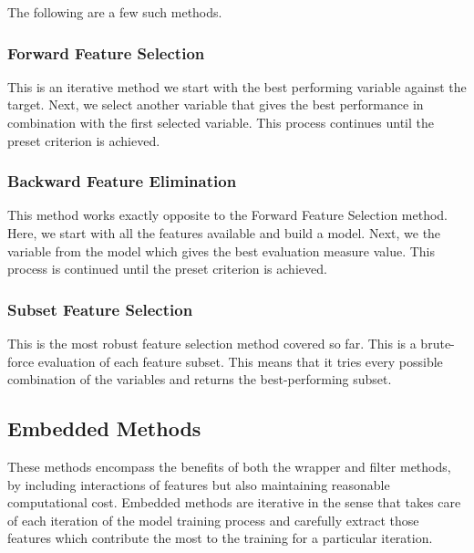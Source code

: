 \documentclass[
]{article}
\begin{document}
The following are a few such methods.

\hypertarget{forward-feature-selection}{%
\subsubsection{Forward Feature
Selection}\label{forward-feature-selection}}

This is an iterative method we start with the best performing variable
against the target. Next, we select another variable that gives the best
performance in combination with the first selected variable. This
process continues until the preset criterion is achieved.

\hypertarget{backward-feature-elimination}{%
\subsubsection{Backward Feature
Elimination}\label{backward-feature-elimination}}

This method works exactly opposite to the Forward Feature Selection
method. Here, we start with all the features available and build a
model. Next, we the variable from the model which gives the best
evaluation measure value. This process is continued until the preset
criterion is achieved.

\hypertarget{subset-feature-selection}{%
\subsubsection{Subset Feature
Selection}\label{subset-feature-selection}}

This is the most robust feature selection method covered so far. This is
a brute-force evaluation of each feature subset. This means that it
tries every possible combination of the variables and returns the
best-performing subset.

\hypertarget{embedded-methods}{%
\subsection{Embedded Methods}\label{embedded-methods}}

These methods encompass the benefits of both the wrapper and filter
methods, by including interactions of features but also maintaining
reasonable computational cost. Embedded methods are iterative in the
sense that takes care of each iteration of the model training process
and carefully extract those features which contribute the most to the
training for a particular iteration.
\end{document}
